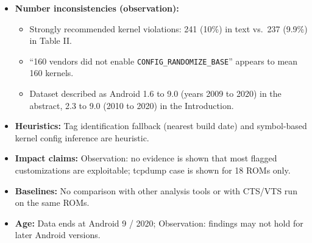 \documentclass[11pt,a4paper]{article}
\begin{document}
\begin{enumerate}
\begin{itemize}[leftmargin=*,itemsep=1pt,topsep=2pt]
\begin{itemize}[itemsep=0pt]
            \item Observation: percentages are over the analyzed subset, not all 2,907.
            \item Headline ``$\sim$20\% of ROMs'' is over all 2,907, while the component results use smaller denominators (2,396 and 1,533). How these combine to 579 is not broken down in the text.
        \end{itemize}
        \item \textbf{Number inconsistencies (observation):}
        \begin{itemize}[itemsep=0pt]
            \item Strongly recommended kernel violations: 241 (10\%) in text vs.\ 237 (9.9\%) in Table II.
            \item ``160 vendors did not enable \texttt{CONFIG\_RANDOMIZE\_BASE}'' appears to mean 160 kernels.
            \item Dataset described as Android 1.6 to 9.0 (years 2009 to 2020) in the abstract, 2.3 to 9.0 (2010 to 2020) in the Introduction.
        \end{itemize}
        \item \textbf{Heuristics:} Tag identification fallback (nearest build date) and symbol-based kernel config inference are heuristic.
        \item \textbf{Impact claims:} Observation: no evidence is shown that most flagged customizations are exploitable; tcpdump case is shown for 18 ROMs only.
        \item \textbf{Baselines:} No comparison with other analysis tools or with CTS/VTS run on the same ROMs.
        \item \textbf{Age:} Data ends at Android 9 / 2020; Observation: findings may not hold for later Android versions.
    \end{itemize}


\end{enumerate}
\end{document}
